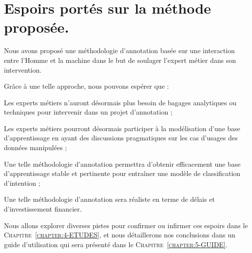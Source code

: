 \section{Espoirs portés sur la méthode proposée.}
\label{section:3.3-ESPOIRS-METHODE}

	Nous avons proposé une méthodologie d'annotation basée sur une interaction entre l'Homme et la machine dans le but de soulager l'expert métier dans son intervention.
	
	Grâce à une telle approche, nous pouvons espérer que :
	\begin{todolist}
		\item Les experts métiers n'auront désormais plus besoin de bagages analytiques ou techniques pour intervenir dans un projet d'annotation ;
		\item Les experts métiers pourront désormais participer à la modélisation d'une base d'apprentissage en ayant des discussions pragmatiques sur les cas d'usages des données manipulées ;
		\item Une telle méthodologie d'annotation permettra d'obtenir efficacement une base d'apprentissage stable et pertinente pour entraîner une modèle de classification d'intention ;
		\item Une telle méthodologie d'annotation sera réaliste en terme de délais et d'investissement financier.
	\end{todolist}
	
	Nous allons explorer diverses pistes pour confirmer ou infirmer ces espoirs dans le \textsc{Chapitre~\ref{chapter:4-ETUDES}}, et nous détaillerons nos conclusions dans un guide d'utilisation qui sera présenté dans le \textsc{Chapitre~\ref{chapter:5-GUIDE}}.